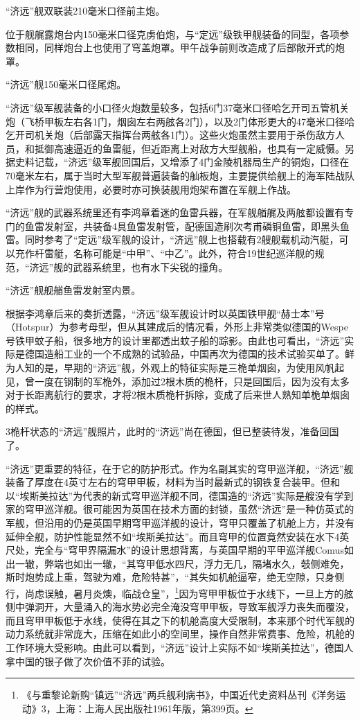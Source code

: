 \documentclass[12pt,UTF8]{ctexbook}
\begin{document}
“济远”舰双联装210毫米口径前主炮。

位于舰艉露炮台内150毫米口径克虏伯炮，与“定远”级铁甲舰装备的同型，各项参数相同，同样炮台上也使用了穹盖炮罩。甲午战争前则改造成了后部敞开式的炮罩。

“济远”舰150毫米口径尾炮。

“济远”级军舰装备的小口径火炮数量较多，包括6门37毫米口径哈乞开司五管机关炮（飞桥甲板左右各1门，烟囱左右两舷各2门），以及2门体形更大的47毫米口径哈乞开司机关炮（后部露天指挥台两舷各1门）。这些火炮虽然主要用于杀伤敌方人员，和抵御高速逼近的鱼雷艇，但近距离上对敌方大型舰船，也具有一定威慑。另据史料记载，“济远”级军舰回国后，又增添了4门金陵机器局生产的铜炮，口径在70毫米左右，属于当时大型军舰普遍装备的舢板炮，主要提供给舰上的海军陆战队上岸作为行营炮使用，必要时亦可换装舰用炮架布置在军舰上作战。

“济远”舰的武器系统里还有李鸿章着迷的鱼雷兵器，在军舰艏艉及两舷都设置有专门的鱼雷发射室，共装备4具鱼雷发射管，配德国造刷次考甫磷铜鱼雷，即黑头鱼雷。同时参考了“定远”级军舰的设计，“济远”舰上也搭载有2艘舰载机动汽艇，可以充作杆雷艇，名称可能是“中甲”、“中乙”。此外，符合19世纪巡洋舰的规范，“济远”舰的武器系统里，也有水下尖锐的撞角。

“济远”舰舰艏鱼雷发射室内景。

根据李鸿章后来的奏折透露，“济远”级军舰设计时以英国铁甲舰“赫士本”号（Hotspur）为参考母型，但从其建成后的情况看，外形上非常类似德国的Wespe号铁甲蚊子船，很多地方的设计里都透出蚊子船的踪影。由此也可看出，“济远”实际是德国造船工业的一个不成熟的试验品，中国再次为德国的技术试验买单了。鲜为人知的是，早期的“济远”舰，外观上的特征实际是三桅单烟囱，为使用风帆起见，曾一度在钢制的军桅外，添加过2根木质的桅杆，只是回国后，因为没有太多对于长距离航行的要求，才将2根木质桅杆拆除，变成了后来世人熟知单桅单烟囱的样式。

3桅杆状态的“济远”舰照片，此时的“济远”尚在德国，但已整装待发，准备回国了。

“济远”更重要的特征，在于它的防护形式。作为名副其实的穹甲巡洋舰，“济远”舰装备了厚度在4英寸左右的穹甲甲板，材料为当时最新式的钢铁复合装甲。但和以“埃斯美拉达”为代表的新式穹甲巡洋舰不同，德国造的“济远”实际是艘没有学到家的穹甲巡洋舰。很可能因为英国在技术方面的封锁，虽然“济远”是一种仿英式的军舰，但沿用的仍是英国早期穹甲巡洋舰的设计，穹甲只覆盖了机舱上方，并没有延伸全舰，防护性能显然不如“埃斯美拉达”。而且穹甲的位置竟然安装在水下4英尺处，完全与“穹甲界隔漏水”的设计思想背离，与英国早期的平甲巡洋舰Comus如出一辙，弊端也如出一辙，“其穹甲低水四尺，浮力无几，隔堵水久，攲侧难免，斯时炮势成上重，驾驶为难，危险特甚”，“其失如机舱逼窄，绝无空隙，只身侧行，尚虑误触，暑月炎燠，临战仓皇”，\footnote{《与重黎论新购“镇远”“济远”两兵舰利病书》，中国近代史资料丛刊《洋务运动》3，上海：上海人民出版社1961年版，第399页。}因为穹甲甲板位于水线下，一旦上方的舷侧中弹洞开，大量涌入的海水势必完全淹没穹甲甲板，导致军舰浮力丧失而覆没，而且穹甲甲板低于水线，使得在其之下的机舱高度大受限制，本来那个时代军舰的动力系统就非常庞大，压缩在如此小的空间里，操作自然非常费事、危险，机舱的工作环境大受影响。由此可以看到，“济远”设计上实际不如“埃斯美拉达”，德国人拿中国的银子做了次价值不菲的试验。
\end{document}
